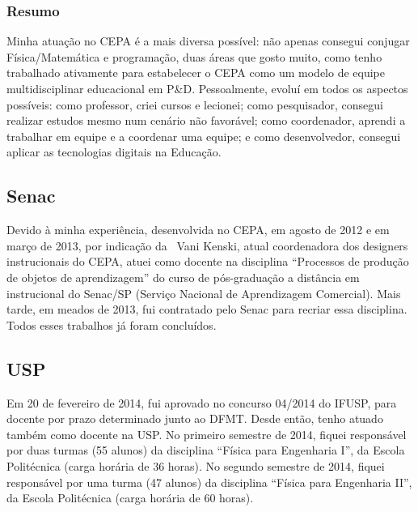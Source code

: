 \subsubsection{Resumo}

Minha atuação no CEPA é a mais diversa possível: não apenas consegui conjugar Física/Matemática e programação, duas áreas que gosto muito, como tenho trabalhado ativamente para estabelecer o CEPA como um modelo de equipe multidisciplinar educacional em P\&D. Pessoalmente, evoluí em todos os aspectos possíveis: como professor, criei cursos e lecionei; como pesquisador, consegui realizar estudos mesmo num cenário não favorável; como coordenador, aprendi a trabalhar em equipe e a coordenar uma equipe; e como desenvolvedor, consegui aplicar as tecnologias digitais na Educação.

\subsection{Senac}

Devido à minha experiência, desenvolvida no CEPA, em agosto de 2012 e em março de 2013, por indicação da \profa\ Vani Kenski, atual coordenadora dos designers instrucionais do CEPA, atuei como docente na disciplina ``Processos de produção de objetos de aprendizagem'' do curso de pós-graduação a distância em  instrucional do Senac/SP (Serviço Nacional de Aprendizagem Comercial). Mais tarde, em meados de 2013, fui contratado pelo Senac para recriar essa disciplina. Todos esses trabalhos já foram concluídos.

\subsection{USP}

Em 20 de fevereiro de 2014, fui aprovado no concurso 04/2014 do IFUSP, para docente por prazo determinado junto ao DFMT. Desde então, tenho atuado também como docente na USP. No primeiro semestre de 2014, fiquei responsável por duas turmas (55 alunos) da disciplina ``Física para Engenharia I'', da Escola Politécnica (carga horária de 36 horas). No segundo semestre de 2014, fiquei responsável por uma turma (47 alunos) da disciplina ``Física para Engenharia II'', da Escola Politécnica (carga horária de 60 horas).
